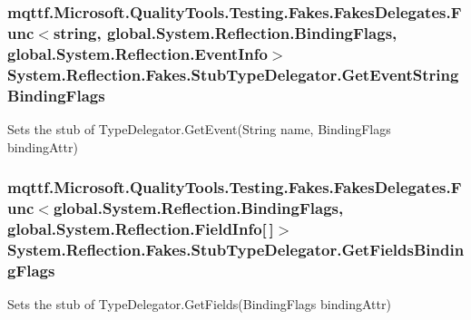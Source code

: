 \hypertarget{class_system_1_1_reflection_1_1_fakes_1_1_stub_type_delegator_a3451b1d90ffc3e447301f4a33344d534}{
\subsubsection[{Get\-Event\-String\-Binding\-Flags}]{\setlength{\rightskip}{0pt plus 5cm}mqttf.\-Microsoft.\-Quality\-Tools.\-Testing.\-Fakes.\-Fakes\-Delegates.\-Func$<$string, global.\-System.\-Reflection.\-Binding\-Flags, global.\-System.\-Reflection.\-Event\-Info$>$ System.\-Reflection.\-Fakes.\-Stub\-Type\-Delegator.\-Get\-Event\-String\-Binding\-Flags}}\label{class_system_1_1_reflection_1_1_fakes_1_1_stub_type_delegator_a3451b1d90ffc3e447301f4a33344d534}


Sets the stub of Type\-Delegator.\-Get\-Event(\-String name, Binding\-Flags binding\-Attr)

\hypertarget{class_system_1_1_reflection_1_1_fakes_1_1_stub_type_delegator_acdb3580a18abb1deb46d59906f475b99}{
\subsubsection[{Get\-Fields\-Binding\-Flags}]{\setlength{\rightskip}{0pt plus 5cm}mqttf.\-Microsoft.\-Quality\-Tools.\-Testing.\-Fakes.\-Fakes\-Delegates.\-Func$<$global.\-System.\-Reflection.\-Binding\-Flags, global.\-System.\-Reflection.\-Field\-Info\mbox{[}$\,$\mbox{]}$>$ System.\-Reflection.\-Fakes.\-Stub\-Type\-Delegator.\-Get\-Fields\-Binding\-Flags}}\label{class_system_1_1_reflection_1_1_fakes_1_1_stub_type_delegator_acdb3580a18abb1deb46d59906f475b99}


Sets the stub of Type\-Delegator.\-Get\-Fields(\-Binding\-Flags binding\-Attr)

